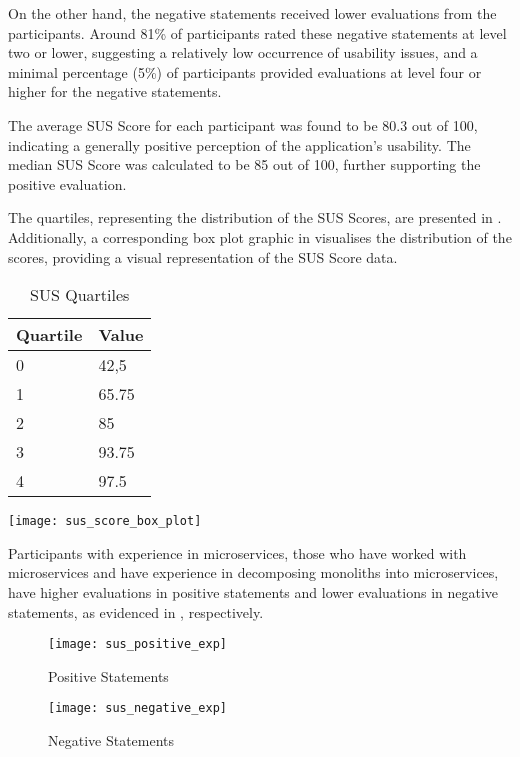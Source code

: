 On the other hand, the negative statements received lower evaluations from the
participants. Around 81\% of participants rated these negative statements at
level two or lower, suggesting a relatively low occurrence of usability issues,
and a minimal percentage (5\%) of participants provided evaluations at level
four or higher for the negative statements.

The average SUS Score for each participant was found to be 80.3 out of 100,
indicating a generally positive perception of the application's usability. The
median SUS Score was calculated to be 85 out of 100, further supporting the
positive evaluation.

The quartiles, representing the distribution of the SUS Scores, are presented
in . Additionally, a corresponding box plot graphic in
 visualises the distribution of the scores, providing a
visual representation of the SUS Score data.

\begin{table}[!htb] \caption{SUS Quartiles} \label{tab:sus_quartiles}
  \begin{center}
    \begin{tabular}[c]{p{8em}|p{8em}}
      \textbf{Quartile} &
      \textbf{Value} \\
      \hline 0 & 42,5 \\
      \hline 1 & 65.75 \\
      \hline 2 & 85 \\
      \hline 3 & 93.75 \\
      \hline 4 & 97.5 \\
    \end{tabular}
  \end{center}
\end{table}

\begin{figure*}[!htb]
  \caption{SUS Box Plot}
  \label{fig:sus_box_plot}
  \centering
  \texttt{[image: sus\_score\_box\_plot]}
\end{figure*}

Participants with experience in microservices, those who have worked with
microservices and have experience in decomposing monoliths into microservices,
have higher evaluations in positive statements and lower evaluations in
negative statements, as evidenced in
,
respectively.

\begin{figure*}[!htb]
  \caption{Experienced Participants Statements Results SUS}
  \label{fig:statements_results_sus_exp}
  \centering
  \begin{subfigure}[b]{1\textwidth}
    \caption{Positive Statements}
    \label{fig:statements_results_sus_positive_exp}
    \texttt{[image: sus\_positive\_exp]}
  \end{subfigure}
  \hfill
  \begin{subfigure}[b]{1\textwidth}
    \caption{Negative Statements}
    \label{fig:statements_results_sus_negative_exp}
    \texttt{[image: sus\_negative\_exp]}
  \end{subfigure}
\end{figure*}
